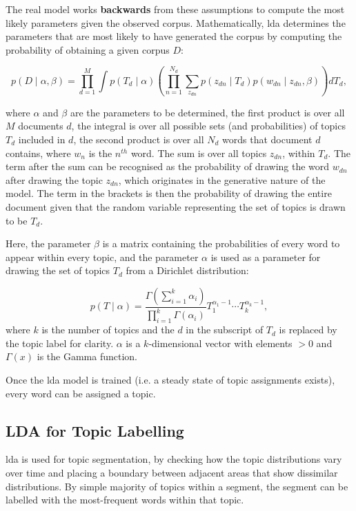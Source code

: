     The real \gls{model} works \textbf{backwards} from these assumptions to compute the most likely parameters given the observed corpus.
    Mathematically, \gls{lda} determines the parameters that are most likely to have generated the corpus by computing the probability of obtaining a given corpus $D$:

    \begin{equation}
        p(D \mid \alpha, \beta)=\prod_{d=1}^{M} \int p\left(T_{d} \mid \alpha\right)\left(\prod_{n=1}^{N_{d}} \sum_{z_{d n}} p\left(z_{d n} \mid T_{d}\right) p\left(w_{d n} \mid z_{d n}, \beta\right)\right) d T_{d},
    \end{equation}

    where $\alpha$ and $\beta$ are the parameters to be determined,
    the first product is over all $M$ documents $d$,
    the integral is over all possible sets (and probabilities) of topics $T_d$ included in $d$,
    the second product is over all $N_d$ words that document $d$ contains, where $w_n$ is the $n^{th}$ word.
    The sum is over all topics $z_{dn}$, within $T_d$.
    The term after the sum can be recognised as the probability of drawing the word $w_{dn}$ after drawing the topic $z_{dn}$, which originates in the generative nature of the \gls{model}.
    The term in the brackets is then the probability of drawing the entire document given that the random variable representing the set of topics is drawn to be $T_d$.

    Here, the parameter $\beta$ is a matrix containing the probabilities of every word to appear within every topic, and the parameter $\alpha$ is used as a parameter for drawing the set of topics $T_d$ from a Dirichlet distribution:

    \begin{equation}
        p(T \mid \alpha)=\frac{\Gamma\left(\sum_{i=1}^{k} \alpha_{i}\right)}{\prod_{i=1}^{k} \Gamma\left(\alpha_{i}\right)} T_{1}^{\alpha_{1}-1} \cdots T_{k}^{\alpha_{k}-1},
    \end{equation}
    where $k$ is the number of topics and the $d$ in the subscript of $T_d$ is replaced by the topic label for clarity. $\alpha$ is a $k$-dimensional vector with elements $> 0$ and $\Gamma(x)$ is the Gamma function.

    Once the \gls{lda} \gls{model} is trained (i.e. a steady state of topic assignments exists), every word can be assigned a topic.


    \subsection{LDA for Topic Labelling \label{ssec: lda for segmentation}}
    \gls{lda} is used for topic segmentation\cite{eisenstein2008bayesian, purver2006unsupervised, nguyen2012sits}, by checking how the topic distributions vary over time and placing a boundary between adjacent areas that show dissimilar distributions.
    By simple majority of topics within a segment, the segment can be labelled with the most-frequent words within that topic.

